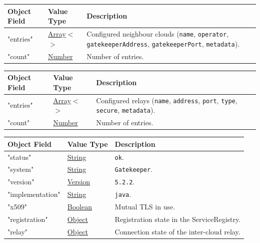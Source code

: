 \documentclass[a4paper]{arrowhead}
\newcommand{\pref}[1]{{\textcolor{ArrowheadGrey}{\hyperref[sec:model:primitives:#1]{#1}}}}
\begin{document}




\noindent\begin{tabularx}{\textwidth}{| >{\raggedright\arraybackslash}p{3.9cm} | >{\raggedright\arraybackslash\small}p{5.3cm} | X |} \hline
\rowcolor{gray!33} Object Field & Value Type & Description \\ \hline
"entries" & \pref{Array}$<$\allowbreak{}\pref{Object}$>$ & Configured neighbour clouds (\texttt{name}, \texttt{operator}, \texttt{gatekeeperAddress}, \texttt{gatekeeperPort}, \texttt{metadata}). \\ \hline
"count" & \pref{Number} & Number of entries. \\ \hline
\end{tabularx}







\noindent\begin{tabularx}{\textwidth}{| >{\raggedright\arraybackslash}p{3.9cm} | >{\raggedright\arraybackslash\small}p{5.3cm} | X |} \hline
\rowcolor{gray!33} Object Field & Value Type & Description \\ \hline
"entries" & \pref{Array}$<$\allowbreak{}\pref{Object}$>$ & Configured relays (\texttt{name}, \texttt{address}, \texttt{port}, \texttt{type}, \texttt{secure}, \texttt{metadata}). \\ \hline
"count" & \pref{Number} & Number of entries. \\ \hline
\end{tabularx}







\noindent\begin{tabularx}{\textwidth}{| >{\raggedright\arraybackslash}p{3.9cm} | >{\raggedright\arraybackslash\small}p{5.3cm} | X |} \hline
\rowcolor{gray!33} Object Field & Value Type & Description \\ \hline
"status" & \pref{String} & \texttt{ok}. \\ \hline
"system" & \pref{String} & \texttt{Gatekeeper}. \\ \hline
"version" & \pref{Version} & \texttt{5.\allowbreak{}2.\allowbreak{}2}. \\ \hline
"implementation" & \pref{String} & \texttt{java}. \\ \hline
"x509" & \pref{Boolean} & Mutual TLS in use. \\ \hline
"registration" & \pref{Object} & Registration state in the ServiceRegistry. \\ \hline
"relay" & \pref{Object} & Connection state of the inter-cloud relay. \\ \hline
\end{tabularx}
\end{document}
